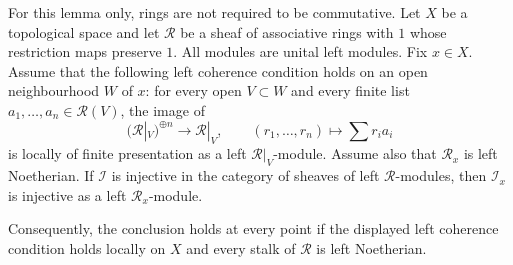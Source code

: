 \begin{lemma}
\label{lemma-injective-left-module-stalks}
\begin{reference}
\cite[Chapter IV, \S 4.1, Proposition 4.1.2, p. 187]{Tohoku}
\end{reference}
For this lemma only, rings are not required to be commutative. Let $X$ be a
topological space and let $\mathcal{R}$ be a sheaf of associative rings with
$1$ whose restriction maps preserve $1$. All modules are unital left
modules. Fix $x \in X$. Assume that the following left coherence condition
holds on an open neighbourhood $W$ of $x$: for every open $V \subset W$ and
every finite list $a_1, \ldots, a_n \in \mathcal{R}(V)$, the image of
$$
(\mathcal{R}|_V)^{\oplus n} \longrightarrow \mathcal{R}|_V,
\qquad
(r_1, \ldots, r_n) \longmapsto \sum r_i a_i
$$
is locally of finite presentation as a left $\mathcal{R}|_V$-module. Assume
also that $\mathcal{R}_x$ is left Noetherian. If $\mathcal{I}$ is injective
in the category of sheaves of left $\mathcal{R}$-modules, then
$\mathcal{I}_x$ is injective as a left $\mathcal{R}_x$-module.

Consequently, the conclusion holds at every point if the displayed left
coherence condition holds locally on $X$ and every stalk of $\mathcal{R}$ is
left Noetherian.
\end{lemma}


